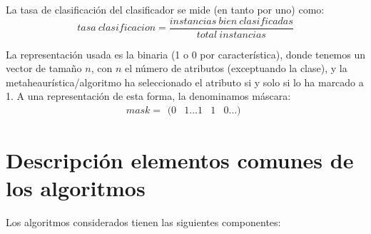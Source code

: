 \documentclass[a4paper,11pt]{article}
\begin{document}
La tasa de clasificación del clasificador se mide (en tanto por uno) como: $$tasa\: clasificacion = \frac{instancias\: 
bien\: clasificadas}{total\: instancias}$$

La representación usada es la binaria (1 o 0 por característica), donde tenemos un vector de tamaño $n$, con $n$ el número 
de atributos (exceptuando la clase), y la metaheaurística/algoritmo ha seleccionado el atributo si y solo si lo ha marcado 
a 1. A una representación de esta forma, la denominamos máscara: $$ mask =\begin{matrix} (0 & 1\ldots 1 & 1 & 0\ldots) 
\end{matrix}$$

\newpage
\section{Descripción elementos comunes de los algoritmos}
Los algoritmos considerados tienen las siguientes componentes:
\end{document}
